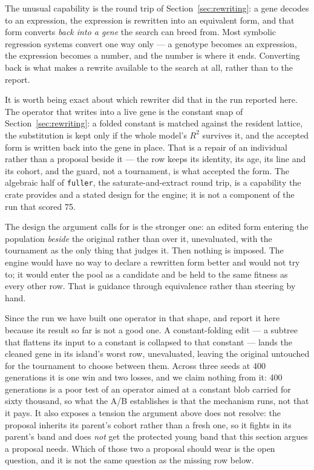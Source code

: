 \documentclass[11pt,a4paper]{article}
\begin{document}
The unusual capability is the round trip of Section~\ref{sec:rewriting}: a gene
decodes to an expression, the expression is rewritten into an equivalent form,
and that form converts \emph{back into a gene} the search can breed from. Most
symbolic regression systems convert one way only --- a genotype becomes an
expression, the expression becomes a number, and the number is where it ends.
Converting back is what makes a rewrite available to the search at all, rather
than to the report.

It is worth being exact about which rewriter did that in the run reported here.
The operator that writes into a live gene is the constant snap of
Section~\ref{sec:rewriting}: a folded constant is matched against the resident
lattice, the substitution is kept only if the whole model's $R^2$ survives it,
and the accepted form is written back into the gene in place. That is a repair
of an individual rather than a proposal beside it --- the row keeps its identity,
its age, its line and its cohort, and the guard, not a tournament, is what
accepted the form. The algebraic half of \texttt{fuller}, the saturate-and-extract
round trip, is a capability the crate provides and a stated design for the
engine; it is not a component of the run that scored 75.

The design the argument calls for is the stronger one: an edited form entering
the population \emph{beside} the original rather than over it, unevaluated, with
the tournament as the only thing that judges it. Then nothing is imposed. The
engine would have no way to declare a rewritten form better and would not try
to; it would enter the pool as a candidate and be held to the same fitness as
every other row. That is guidance through equivalence rather than steering by
hand.

Since the run we have built one operator in that shape, and report it here
because its result so far is not a good one. A constant-folding edit --- a
subtree that flattens its input to a constant is collapsed to that constant ---
lands the cleaned gene in its island's worst row, unevaluated, leaving the
original untouched for the tournament to choose between them. Across three seeds
at 400 generations it is one win and two losses, and we claim nothing from it:
400 generations is a poor test of an operator aimed at a constant blob carried
for sixty thousand, so what the A/B establishes is that the mechanism runs, not
that it pays. It also exposes a tension the argument above does not
resolve: the proposal inherits its parent's cohort rather than a fresh one, so
it fights in its parent's band and does \emph{not} get the protected young band
that this section argues a proposal needs. Which of those two a proposal should
wear is the open question, and it is not the same question as the missing row
below.
\end{document}
